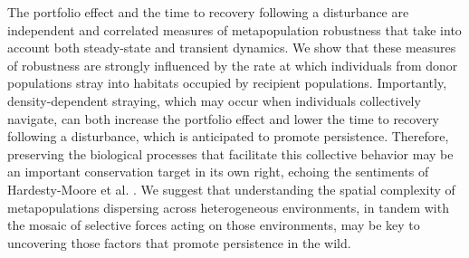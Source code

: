 \documentclass{revtex4}
\begin{document}

The portfolio effect and the time to recovery following a disturbance are independent and correlated measures of metapopulation robustness that take into account both steady-state and transient dynamics.
We show that these measures of robustness are strongly influenced by the rate at which individuals from donor populations stray into habitats occupied by recipient populations. 
Importantly, density-dependent straying, which may occur when individuals collectively navigate, can both increase the portfolio effect and lower the time to recovery following a disturbance, which is anticipated to promote persistence. 
Therefore, preserving the biological processes that facilitate this collective behavior may be an important conservation target in its own right, echoing the sentiments of  Hardesty-Moore et al. \citep{HardestyMoore:wg}. 
We suggest that understanding the spatial complexity of metapopulations dispersing across heterogeneous environments, in tandem with the mosaic of selective forces acting on those environments, may be key to uncovering those factors that promote persistence in the wild.
\\ \\
\end{document}
